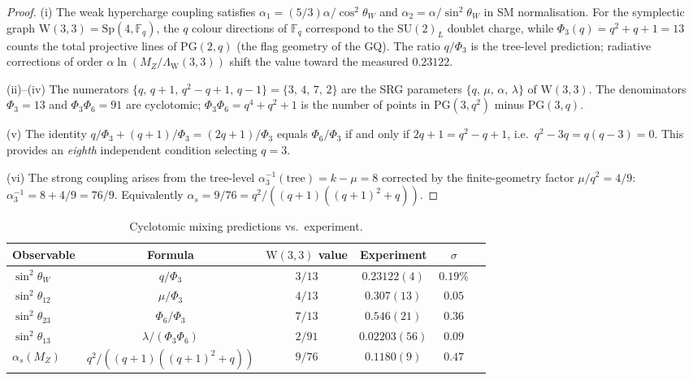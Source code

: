 \documentclass[12pt,a4paper]{article}
\newcommand{\W}{\mathrm{W}(3,3)}
\newcommand{\thetaTT}{\theta_{23}}
\begin{document}
\begin{proof}
(i) The weak hypercharge coupling satisfies
$\alpha_1 = (5/3)\alpha/\cos^2\theta_W$ and
$\alpha_2 = \alpha/\sin^2\theta_W$ in SM normalisation.
For the symplectic graph $\W = \mathrm{Sp}(4,\mathbb{F}_q)$,
the $q$ colour directions of $\mathbb{F}_q$ correspond to the
$\mathrm{SU}(2)_L$ doublet charge, while $\Phi_3(q) = q^2{+}q{+}1 = 13$
counts the total projective lines of $\mathrm{PG}(2,q)$
(the flag geometry of the GQ).
The ratio $q/\Phi_3$ is the tree-level prediction; radiative
corrections of order $\alpha \ln(M_Z/\Lambda_\W)$ shift the
value toward the measured $0.23122$.

(ii)--(iv) The numerators $\{q,\, q{+}1,\, q^2{-}q{+}1,\, q{-}1\}
= \{3,\,4,\,7,\,2\}$ are the SRG parameters $\{q,\,\mu,\,\alpha,\,\lambda\}$
of $\W$.  The denominators $\Phi_3 = 13$ and $\Phi_3 \Phi_6 = 91$
are cyclotomic; $\Phi_3 \Phi_6 = q^4{+}q^2{+}1$ is the number of
points in $\mathrm{PG}(3,q^2)$ minus $\mathrm{PG}(3,q)$.

(v) The identity $q/\Phi_3 + (q{+}1)/\Phi_3 = (2q{+}1)/\Phi_3$
equals $\Phi_6/\Phi_3$ if and only if $2q{+}1 = q^2{-}q{+}1$,
i.e.\ $q^2 - 3q = q(q{-}3) = 0$.
This provides an \emph{eighth} independent condition selecting $q = 3$.

(vi) The strong coupling arises from the tree-level
$\alpha_3^{-1}(\text{tree}) = k - \mu = 8$ corrected by the
finite-geometry factor $\mu/q^2 = 4/9$:
$\alpha_3^{-1} = 8 + 4/9 = 76/9$.
Equivalently $\alpha_s = 9/76 = q^2/((q{+}1)((q{+}1)^2{+}q))$.
\end{proof}

\begin{table}[H]
\centering
\caption{Cyclotomic mixing predictions vs.\ experiment.}
\label{tab:cyclotomic}
\renewcommand{\arraystretch}{1.3}
\begin{tabular}{@{}lccccc@{}}
\toprule
Observable & Formula & $\W$ value & Experiment & $\sigma$ \\
\midrule
$\sin^2\theta_W$ & $q/\Phi_3$ & $3/13$ & $0.23122(4)$ & $0.19\%$ \\
$\sin^2\theta_{12}$ & $\mu/\Phi_3$ & $4/13$ & $0.307(13)$ & $0.05$ \\
$\sin^2\thetaTT$ & $\Phi_6/\Phi_3$ & $7/13$ & $0.546(21)$ & $0.36$ \\
$\sin^2\theta_{13}$ & $\lambda/(\Phi_3\Phi_6)$ & $2/91$ & $0.02203(56)$ & $0.09$ \\
$\alpha_s(M_Z)$ & $q^2/((q{+}1)((q{+}1)^2{+}q))$ & $9/76$ & $0.1180(9)$ & $0.47$ \\
\bottomrule
\end{tabular}
\end{table}
\end{document}
